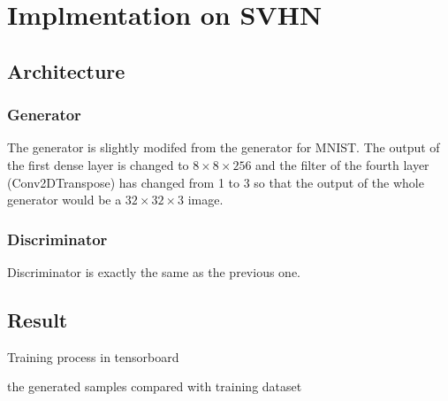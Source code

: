\documentclass{article}
\begin{document}
\section{Implmentation on SVHN}

\subsection{Architecture}

\subsubsection{Generator}

The generator is slightly modifed from the generator for MNIST. 
The output of the first dense layer is changed to $8\times 8\times 256$ 
and the filter of the fourth layer (Conv2DTranspose) has changed from 1 to 3
so that the output of the whole generator would be a $32\times 32\times 3$ image.

\subsubsection{Discriminator}

Discriminator is exactly the same as the previous one.

\subsection{Result}

Training process in tensorboard

the generated samples compared with training dataset
\end{document}
